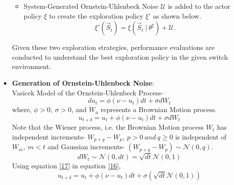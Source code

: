 \documentclass{article}
\begin{document}
\begin{itemize}
\begin{itemize}
        \item System-Generated Ornstein-Uhlenbeck Noise $\mathcal{U}$ is added to the actor policy $\xi$ to create the exploration policy $\xi'$ as shown below.
        \begin{equation}
            \xi'(\vec{S}_t) = \xi(\vec{S}_t\ |\ \theta^{\xi}) + \mathcal{U}.
        \end{equation}
    \end{itemize}
    Given these two exploration strategies, performance evaluations are conducted to understand the best exploration policy in the given switch environment.
    \item \textbf{Generation of Ornstein-Uhlenbeck Noise}:
    \\Vasicek Model of the Ornstein-Uhlenbeck Process-
    \begin{equation}
        du_{t} = \phi(\nu - u_{t}) dt + \sigma dW_{t}
    \end{equation}
    where, $\phi > 0,\ \sigma > 0$, and $W_u$ represents a Brownian Motion process.
    \begin{equation}\label{16}
        u_{t+\delta} = u_{t} + \phi(\nu - u_{t}) dt + \sigma dW_{t}
    \end{equation}
    Note that the Wiener process, i.e. the Brownian Motion process $W_t$ has independent increments- $W_{p+q} - W_{p},\ p > 0\ and\ q \geq 0$ is independent of $W_{m},\ m < t$ and Gaussian increments- $(W_{p+q} - W_p) \sim \mathcal{N}(0, q)$.
    \begin{equation}\label{17}
        dW_{t} \sim \mathcal{N}(0, dt) = \sqrt{dt} \mathcal{N}(0, 1)
    \end{equation}
    Using equation \eqref{17} in equation \eqref{16},
    \begin{equation}
        u_{t+\delta} = u_{t} + \phi(\nu - u_{t}) dt + \sigma(\sqrt{dt} \mathcal{N}(0, 1))
    \end{equation}
\end{itemize}
\end{document}
